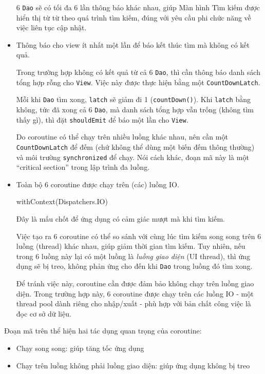 \documentclass[
]{article}
\newenvironment{Shaded}{}{}
\newcommand{\NormalTok}[1]{#1}
\newcommand{\OperatorTok}[1]{\textcolor[rgb]{0.40,0.40,0.40}{#1}}
\providecommand{\tightlist}{%
  \setlength{\itemsep}{0pt}\setlength{\parskip}{0pt}}
\begin{document}
\begin{itemize}
  6 \texttt{Dao} sẽ có tối đa 6 lần thông báo khác nhau, giúp Màn hình
  Tìm kiếm được hiển thị từ từ theo quá trình tìm kiếm, đúng với yêu cầu
  phi chức năng về việc liên tục cập nhật.
\item
  Thông báo cho view ít nhất một lần để báo kết thúc tìm mà không có kết
  quả.

  Trong trường hợp không có kết quả từ cả 6 \texttt{Dao}, thì cần thông
  báo danh sách tổng hợp rỗng cho \texttt{View}. Việc này được thực hiện
  bằng một \texttt{CountDownLatch}.

  Mỗi khi \texttt{Dao} tìm xong, \texttt{latch} sẽ giảm đi 1
  (\texttt{countDown()}). Khi \texttt{latch} bằng không, tức đã xong cả
  6 \texttt{Dao}, mà danh sách tổng hợp vẫn trống (không tìm thấy gì),
  thì đặt \texttt{shouldEmit} để báo một lần cho \texttt{View}.

  Do coroutine có thể chạy trên nhiều luồng khác nhau, nên cần một
  \texttt{CountDownLatch} để đếm (chứ không thể dùng một biến đếm thông
  thường) và môi trường \texttt{synchronized} để chạy. Nói cách khác,
  đoạn mã này là một ``critical section'' trong lập trình đa luồng.
\item
  Toàn bộ 6 coroutine được chạy trên (các) luồng IO.

\begin{Shaded}
\begin{Highlighting}[]
\NormalTok{withContext}\OperatorTok{(}\NormalTok{Dispatchers}\OperatorTok{.}\NormalTok{IO}\OperatorTok{)}
\end{Highlighting}
\end{Shaded}

  Đây là mấu chốt để ứng dụng có cảm giác mượt mà khi tìm kiếm.

  Việc tạo ra 6 coroutine có thể so sánh với cùng lúc tìm kiếm song song
  trên 6 luồng (thread) khác nhau, giúp giảm thời gian tìm kiếm. Tuy
  nhiên, nếu trong 6 luồng này lại có một luồng là \emph{luồng giao
  diện} (UI thread), thì ứng dụng sẽ bị treo, không phản ứng cho đến khi
  \texttt{Dao} trong luồng đó tìm xong.

  Để tránh việc này, coroutine cần được đảm bảo không chạy trên luồng
  giao diện. Trong trường hợp này, 6 coroutine được chạy trên các luồng
  IO - một thread pool dành riêng cho nhập/xuất - phù hợp với bản chất
  công việc là đọc cơ sở dữ liệu.
\end{itemize}

Đoạn mã trên thể hiện hai tác dụng quan trọng của coroutine:

\begin{itemize}
\tightlist
\item
  Chạy song song: giúp tăng tốc ứng dụng
\item
  Chạy trên luồng không phải luồng giao diện: giúp ứng dụng không bị
  treo
\end{itemize}
\end{document}
